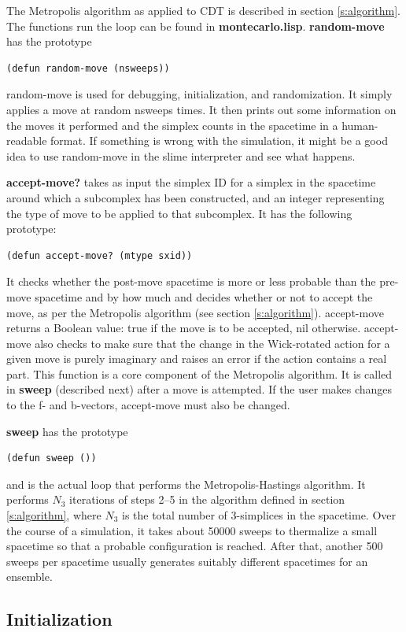 \documentclass[12pt]{article}
\begin{document}
The Metropolis algorithm as applied to CDT is described in section
\ref{s:algorithm}. The functions run the loop can be found in
\textbf{montecarlo.lisp}. \textbf{random-move} has the prototype 
\begin{lstlisting}
(defun random-move (nsweeps))
\end{lstlisting}
random-move is used for debugging, initialization, and
randomization. It simply applies a move at random nsweeps times. It
then prints out some information on the moves it performed and the
simplex counts in the spacetime in a human-readable format. If
something is wrong with the simulation, it might be a good idea to use
random-move in the slime interpreter and see what happens.

\textbf{accept-move?} takes as input the simplex ID for a simplex in
the spacetime around which a subcomplex has been constructed, and an
integer representing the type of move to be applied to that
subcomplex. It has the following prototype:
\begin{lstlisting}
(defun accept-move? (mtype sxid))
\end{lstlisting}
It checks whether the post-move spacetime is more or less probable
than the pre-move spacetime and by how much and decides whether or not
to accept the move, as per the Metropolis algorithm (see section
\ref{s:algorithm}). accept-move returns a Boolean value: true if the
move is to be accepted, nil otherwise. accept-move also checks to make
sure that the change in the Wick-rotated action for a given move is
purely imaginary and raises an error if the action contains a real
part. This function is a core component of the Metropolis
algorithm. It is called in \textbf{sweep} (described next) after a
move is attempted. If the user makes changes to the f- and b-vectors,
accept-move must also be changed.

\textbf{sweep} has the prototype 
\begin{lstlisting}
(defun sweep ())
\end{lstlisting}
and is the actual loop that performs the Metropolis-Hastings
algorithm. It performs $N_3$ iterations of steps 2--5 in the algorithm
defined in section \ref{s:algorithm}, where $N_3$ is the total number
of 3-simplices in the spacetime. Over the course of a simulation, it
takes about 50000 sweeps to thermalize a small spacetime so that a
probable configuration is reached. After that, another 500 sweeps per
spacetime usually generates suitably different spacetimes for an
ensemble.

\subsection{Initialization}
\label{s:initialization}
\end{document}
